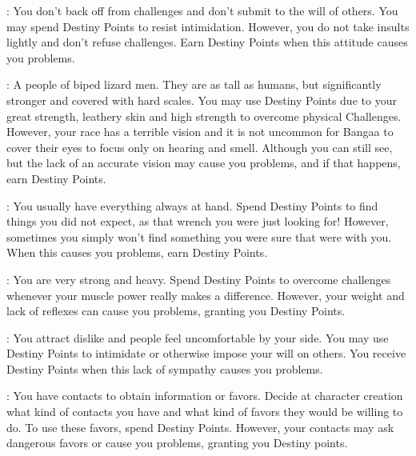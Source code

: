 \begin{multicols}{2}
\begin{ffcolpage}
: You don’t back off from challenges and don’t submit to the will of others. You may spend Destiny Points to resist intimidation. However, you do not take insults lightly and don’t refuse challenges. Earn Destiny Points when this attitude causes you problems.
\end{ffcolpage} \pw \begin{minipage}{.35\textwidth-2\columnsep}
: A people of biped lizard men. They are as tall as humans, but significantly stronger and covered with hard scales. You may use Destiny Points due to your great strength, leathery skin and high strength to overcome physical Challenges. However, your race has a terrible vision and it is not uncommon for Bangaa to cover their eyes to focus only on hearing and smell. Although you can still see, but the lack of an accurate vision may cause you problems, and if that happens, earn Destiny Points.
\end{minipage} \pw \begin{ffcolpage}
: You usually have everything always at hand. Spend Destiny Points to find things you did not expect, as that wrench you were just looking for! However, sometimes you simply won’t find something you were sure that were with you. When this causes you problems, earn Destiny Points.
\end{ffcolpage} \pw \begin{ffcolpage}
: You are very strong and heavy. Spend Destiny Points to overcome challenges whenever your muscle power really makes a difference. However, your weight and lack of reflexes can cause you problems, granting you Destiny Points.
\end{ffcolpage} \pw \begin{ffcolpage}
: You attract dislike and people feel uncomfortable by your side. You may use Destiny Points to intimidate or otherwise impose your will on others. You receive Destiny Points when this lack of sympathy causes you problems.
\end{ffcolpage} \pw \begin{ffcolpage}
: You have contacts to obtain information or favors. Decide at character creation what kind of contacts you have and what kind of favors they would be willing to do. To use these favors, spend Destiny Points. However, your contacts may ask dangerous favors or cause you problems, granting you Destiny points.

\end{ffcolpage}
\end{multicols}
